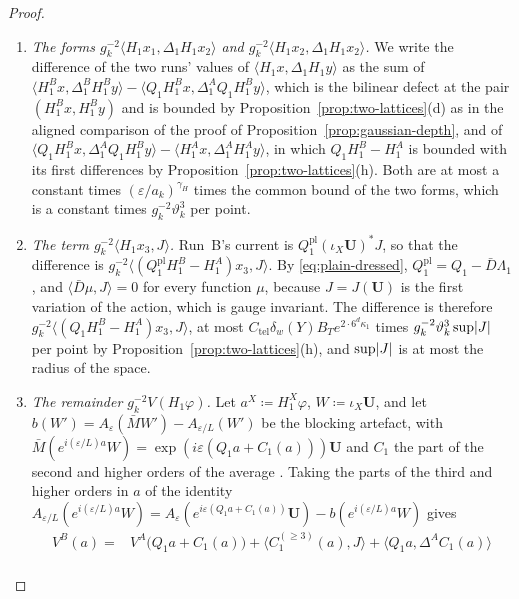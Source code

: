\documentclass[11pt]{preprint}
\DeclarePairedDelimiter{\abs}{\lvert}{\rvert}
\numberwithin{equation}{section}
\theoremstyle{definition}
\theoremstyle{remark}
\theoremstyle{plain}
\begin{document}
\begin{proof}
\begin{enumerate}[label=(\arabic*)]
\item \emph{The forms $g_k^{-2}\langle H_1x_1, \Delta_1H_1x_2\rangle$ and $g_k^{-2}\langle H_1x_2, \Delta_1H_1x_2\rangle$.} We write the difference of the two runs' values of $\langle H_1x, \Delta_1H_1y\rangle$ as the sum of $\langle H^B_1x, \Delta^B_1H^B_1y\rangle - \langle Q_1H^B_1x, \Delta^A_1Q_1H^B_1y\rangle$, which is the bilinear defect at the pair $(H^B_1x, H^B_1y)$ and is bounded by Proposition~\ref{prop:two-lattices}(d) as in the aligned comparison of the proof of Proposition~\ref{prop:gaussian-depth}, and of $\langle Q_1H^B_1x, \Delta^A_1Q_1H^B_1y\rangle - \langle H^A_1x, \Delta^A_1H^A_1y\rangle$, in which $Q_1H^B_1 - H^A_1$ is bounded with its first differences by Proposition~\ref{prop:two-lattices}(h). Both are at most a constant times $(\varepsilon/a_k)^{\gamma_H}$ times the common bound of the two forms, which is a constant times $g_k^{-2}\vartheta_k^3$ per point.
\item \emph{The term $g_k^{-2}\langle H_1x_3, J\rangle$.} Run~B's current is $Q^{\mathrm{pl}}_1(\iota_X\mathbf U)^*J$, so that the difference is $g_k^{-2}\langle(Q^{\mathrm{pl}}_1H^B_1 - H^A_1)x_3, J\rangle$. By \eqref{eq:plain-dressed}, $Q^{\mathrm{pl}}_1 = Q_1 - \bar D\Lambda_1$, and $\langle\bar D\mu, J\rangle = 0$ for every function $\mu$, because $J = J(\mathbf U)$ is the first variation of the action, which is gauge invariant. The difference is therefore $g_k^{-2}\langle(Q_1H^B_1 - H^A_1)x_3, J\rangle$, at most $C_{\mathrm{tel}}\delta_w(Y)B_Te^{2 \cdot 6^d\kappa_1}$ times $g_k^{-2}\vartheta_k^3\sup\abs J$ per point by Proposition~\ref{prop:two-lattices}(h), and $\sup\abs J$ is at most the radius of the space.
\item \emph{The remainder $g_k^{-2}V(H_1\varphi)$.} Let $a^X \coloneqq H^X_1\varphi$, $W \coloneqq \iota_X\mathbf U$, and let $b(W') = A_\varepsilon(\bar MW') - A_{\varepsilon/L}(W')$ be the blocking artefact, with $\bar M(e^{i(\varepsilon/L)a}W) = \exp(i\varepsilon(Q_1a + C_1(a)))\mathbf U$ and $C_1$ the part of the second and higher orders of the average \cite[(122), (123), p.~36]{BalabanAVG}. Taking the parts of the third and higher orders in $a$ of the identity $A_{\varepsilon/L}(e^{i(\varepsilon/L)a}W) = A_\varepsilon(e^{i\varepsilon(Q_1a + C_1(a))}\mathbf U) - b(e^{i(\varepsilon/L)a}W)$ gives
\begin{equation}\label{eq:remainder-difference}
\begin{aligned}
    V^B(a) ={}& V^A\bigl(Q_1a + C_1(a)\bigr) + \bigl\langle C_1^{(\geq 3)}(a), J\bigr\rangle + \bigl\langle Q_1a, \Delta^AC_1(a)\bigr\rangle\\

\end{aligned}
\end{equation}
\end{enumerate}
\end{proof}
\end{document}
